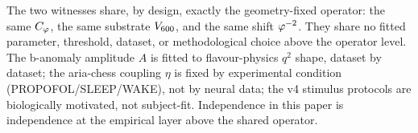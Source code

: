 The two witnesses share, by design, exactly the geometry-fixed
operator: the same $C_{\varphi}$, the same substrate $V_{600}$, and
the same shift $\varphi^{-2}$. They share no fitted parameter,
threshold, dataset, or methodological choice above the operator
level. The b-anomaly amplitude $A$ is fitted to flavour-physics
$q^{2}$ shape, dataset by dataset; the aria-chess coupling $\eta$
is fixed by experimental condition (PROPOFOL/SLEEP/WAKE), not by
neural data; the v4 stimulus protocols are biologically motivated,
not subject-fit. Independence in this paper is independence at
the empirical layer above the shared operator.
